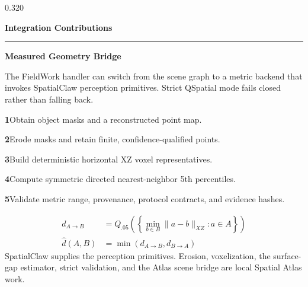 \documentclass{beamer}
\newenvironment{possection}[2]{%
  \par\vspace{0.10cm}%
  \noindent{\color{ncgreendark}\bfseries\large #1}\hspace{0.42em}%
  {\color{ncink}\bfseries\large #2}\par\vspace{-0.20cm}%
  \noindent\textcolor{ncline}{\rule{\linewidth}{0.9pt}}\par\vspace{0cm}%
  \begin{minipage}{\linewidth}%
}{%
  \end{minipage}\par\vspace{0.40cm}%
}
\newcommand{\possub}[2]{%
  \par\vspace{0.02cm}%
  \noindent{\color{ncgreendark}\bfseries #1}\hspace{0.38em}%
  {\color{ncink}\bfseries #2}\par\vspace{0.07cm}%
}
\newcommand{\stp}[1]{{\ttfamily\bfseries\color{ncgreendark}#1}}
\begin{document}
\begin{frame}[t]
\begin{columns}[t,onlytextwidth]
\begin{column}{0.320\textwidth}
  \begin{possection}{7.}{Integration Contributions}
    \possub{7.1}{Measured Geometry Bridge}
    The FieldWork handler can switch from the scene graph to a metric backend that
    invokes SpatialClaw perception primitives. Strict QSpatial mode fails closed
    rather than falling back.
    \par\vspace{0.16cm}
    \stp{1}\hspace{0.45em}Obtain object masks and a reconstructed point map.\par
    \stp{2}\hspace{0.45em}Erode masks and retain finite, confidence-qualified points.\par
    \stp{3}\hspace{0.45em}Build deterministic horizontal XZ voxel representatives.\par
    \stp{4}\hspace{0.45em}Compute symmetric directed nearest-neighbor 5th percentiles.\par
    \stp{5}\hspace{0.45em}Validate metric range, provenance, protocol contracts,
    and evidence hashes.\par
    \vspace{0.10cm}
    \begin{align}
      d_{A\rightarrow B}
        &= Q_{.05}\!\left(
          \left\{\min_{b\in B}\lVert a-b\rVert_{XZ}:a\in A\right\}
        \right)\\
      \hat d(A,B) &= \min(d_{A\rightarrow B},d_{B\rightarrow A})
    \end{align}
    \vspace{-0.20cm}
    {\color{ncmuted}\normalsize SpatialClaw supplies the perception primitives.
    Erosion, voxelization, the surface-gap estimator, strict validation, and
    the Atlas scene bridge are local Spatial Atlas work.}
    \par\vspace{0.26cm}


\end{possection}
\end{column}
\end{columns}
\end{frame}
\end{document}
